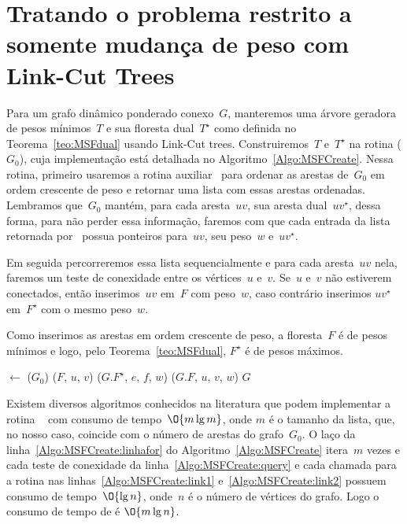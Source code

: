 
\section{Tratando o problema restrito a somente mudança de peso com Link-Cut Trees}

Para um grafo dinâmico ponderado conexo~$G$, manteremos uma árvore geradora de pesos mínimos~$T$ e sua floresta dual~$T^\star$ como definida no Teorema~\ref{teo:MSFdual} usando Link-Cut trees.
Construiremos~$T$ e~$T^\star$ na rotina \MSFCreate($G_0$), cuja implementação está detalhada no Algoritmo~\ref{Algo:MSFCreate}.
Nessa rotina, primeiro usaremos a rotina auxiliar~\order{} para ordenar as arestas de~$G_0$ em ordem crescente de peso e retornar uma lista com essas arestas ordenadas.
Lembramos que~$G_0$ mantém, para cada aresta~$uv$, sua aresta dual~$uv^\star$, dessa forma, para não perder essa informação, faremos com que cada entrada da lista retornada por~\order{}
possua ponteiros para~$uv$, seu peso~$w$ e~$uv^\star$.



Em seguida percorreremos essa lista sequencialmente e para cada aresta~$uv$ nela, faremos um teste de conexidade entre os vértices~$u$ e~$v$.
Se~$u$ e~$v$ não estiverem conectados, então inserimos~$uv$ em~$F$ com peso~$w$, caso contrário inserimos $uv^\star$ em~$F^\star$ com o mesmo peso~$w$.

Como inserimos as arestas em ordem crescente de peso, a floresta~$F$ é de pesos mínimos e logo, pelo Teorema~\ref{teo:MSFdual}, $F^\star$ é de pesos máximos.

\begin{algorithm}[htb]
\caption{\MSFCreate($n$, $G_0$)}
\label{Algo:MSFCreate}
\begin{algorithmic}[1]
\State {} $\gets$ \order($G_0$)
\label{Algo:MSFCreate:linhafor}
\If \linkcutQuery($F$, $u$, $v$)\label{Algo:MSFCreate:query}
\State \linkcutAddEdge($G$.$F^\star$, $e$, $f$, $w$)\label{Algo:MSFCreate:link1}
\Else
\State \linkcutAddEdge($G$.$F$, $u$, $v$, $w$)\label{Algo:MSFCreate:link2}
\EndIf
\EndFor
\State \Return $G$
\end{algorithmic}
\end{algorithm}

Existem diversos algoritmos conhecidos na literatura que podem implementar a rotina \order{}~\cite{CLRS} com consumo de tempo~$\O{m\lg m}$, onde $m$ é o tamanho da lista,
que, no nosso caso, coincide com o número de arestas do grafo~$G_0$.
O laço da linha~\ref{Algo:MSFCreate:linhafor} do Algoritmo~\ref{Algo:MSFCreate} itera~$m$ vezes e cada teste de conexidade da linha~\ref{Algo:MSFCreate:query} e cada chamada para a rotina  \linkcutAddEdge{} nas linhas~\ref{Algo:MSFCreate:link1} e~\ref{Algo:MSFCreate:link2} possuem consumo de tempo~$\O{\lg n}$, onde~$n$ é o número de vértices do grafo.
Logo o consumo de tempo de \MSFCreate{} é $\O{m\lg n}$.

